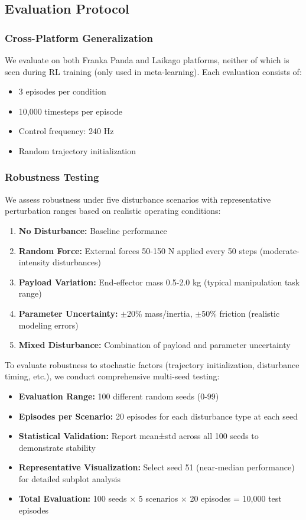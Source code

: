 \documentclass[a4paper]{cas-sc}
\begin{document}
\subsection{Evaluation Protocol}

\subsubsection{Cross-Platform Generalization}
We evaluate on both Franka Panda and Laikago platforms, neither of which is seen during RL training (only used in meta-learning). Each evaluation consists of:
\begin{itemize}
    \item 3 episodes per condition
    \item 10,000 timesteps per episode
    \item Control frequency: 240 Hz
    \item Random trajectory initialization
\end{itemize}

\subsubsection{Robustness Testing}
We assess robustness under five disturbance scenarios with representative perturbation ranges based on realistic operating conditions:
\begin{enumerate}
    \item \textbf{No Disturbance:} Baseline performance
    \item \textbf{Random Force:} External forces 50-150 N applied every 50 steps (moderate-intensity disturbances)
    \item \textbf{Payload Variation:} End-effector mass 0.5-2.0 kg (typical manipulation task range)
    \item \textbf{Parameter Uncertainty:} $\pm$20\% mass/inertia, $\pm$50\% friction (realistic modeling errors)
    \item \textbf{Mixed Disturbance:} Combination of payload and parameter uncertainty
\end{enumerate}

To evaluate robustness to stochastic factors (trajectory initialization, disturbance timing, etc.), we conduct comprehensive multi-seed testing:
\begin{itemize}
    \item \textbf{Evaluation Range:} 100 different random seeds (0-99)
    \item \textbf{Episodes per Scenario:} 20 episodes for each disturbance type at each seed
    \item \textbf{Statistical Validation:} Report mean±std across all 100 seeds to demonstrate stability
    \item \textbf{Representative Visualization:} Select seed 51 (near-median performance) for detailed subplot analysis
    \item \textbf{Total Evaluation:} 100 seeds $\times$ 5 scenarios $\times$ 20 episodes = 10,000 test episodes
\end{itemize}
\end{document}
